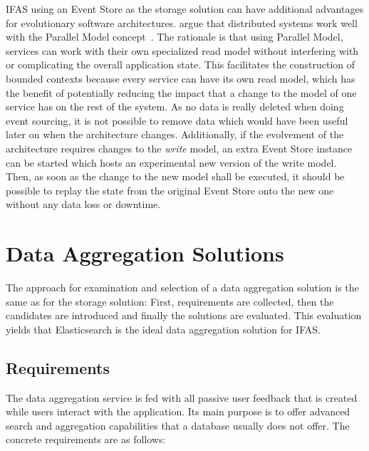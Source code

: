 \ac{IFAS} using an Event Store as the storage solution can have additional advantages for evolutionary software architectures.
\citet{ford2017building} argue that distributed systems work well with the Parallel Model concept~\cite{WEB:Fowler:2005-2}.
The rationale is that using Parallel Model, services can work with their own specialized read model without interfering with or complicating the overall application state.
This facilitates the construction of bounded contexts because every service can have its own read model, which has the benefit of potentially reducing the impact that a change to the model of one service has on the rest of the system.
As no data is really deleted when doing event sourcing, it is not possible to remove data which would have been useful later on when the architecture changes.
Additionally, if the evolvement of the architecture requires changes to the \emph{write} model, an extra Event Store instance can be started which hosts an experimental new version of the write model.
Then, as soon as the change to the new model shall be executed, it should be possible to replay the state from the original Event Store onto the new one without any data loss or downtime.

\section{Data Aggregation Solutions}
\label{sec:classifications:aggregation}

The approach for examination and selection of a data aggregation solution is the same as for the storage solution:
First, requirements are collected, then the candidates are introduced and finally the solutions are evaluated.
This evaluation yields that Elasticsearch is the ideal data aggregation solution for \ac{IFAS}.


\subsection{Requirements}

The data aggregation service is fed with all passive user feedback that is created while users interact with the application.
Its main purpose is to offer advanced search and aggregation capabilities that a database usually does not offer.
The concrete requirements are as follows:

